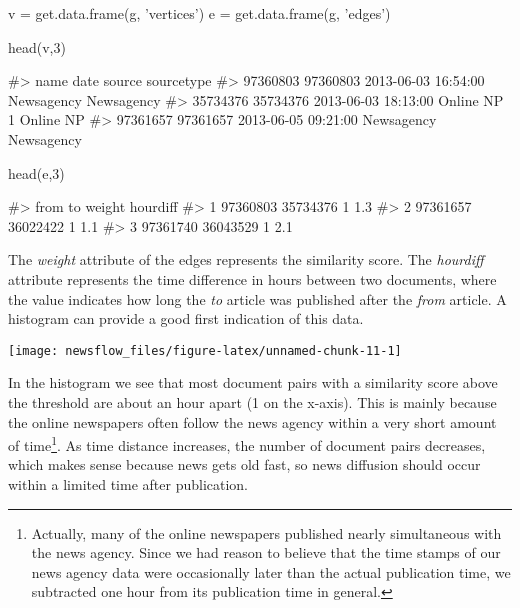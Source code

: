 \begin{Schunk}
\begin{Sinput}
v = get.data.frame(g, 'vertices')
e = get.data.frame(g, 'edges')

head(v,3)
\end{Sinput}
\begin{Soutput}
#>              name                date      source sourcetype
#> 97360803 97360803 2013-06-03 16:54:00  Newsagency Newsagency
#> 35734376 35734376 2013-06-03 18:13:00 Online NP 1  Online NP
#> 97361657 97361657 2013-06-05 09:21:00  Newsagency Newsagency
\end{Soutput}
\begin{Sinput}
head(e,3)    
\end{Sinput}
\begin{Soutput}
#>       from       to weight hourdiff
#> 1 97360803 35734376      1      1.3
#> 2 97361657 36022422      1      1.1
#> 3 97361740 36043529      1      2.1
\end{Soutput}
\end{Schunk}

The \emph{weight} attribute of the edges represents the similarity
score. The \emph{hourdiff} attribute represents the time difference in
hours between two documents, where the value indicates how long the
\emph{to} article was published after the \emph{from} article. A
histogram can provide a good first indication of this data.

\begin{Schunk}

\texttt{[image: newsflow\_files/figure-latex/unnamed-chunk-11-1]} \end{Schunk}

In the histogram we see that most document pairs with a similarity score above the threshold are about an hour apart (1 on the x-axis). 
This is mainly because the online newspapers often follow the news agency within a very short amount of time\footnote{Actually, many of the online newspapers published nearly simultaneous with the news agency. Since we had reason to believe that the time stamps of our news agency data were occasionally later than the actual publication time, we subtracted one hour from its publication time in general.}.
As time distance increases, the number of document pairs decreases, which makes sense because news gets old fast, so news diffusion should occur within a limited time after publication.


